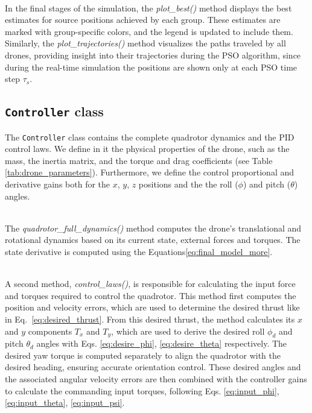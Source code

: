 \noindent\\
In the final stages of the simulation, the \textit{plot\_best()} 
method displays the best estimates for source positions achieved 
by each group. These estimates are marked with group-specific colors, 
and the legend is updated to include them. Similarly, 
the \textit{plot\_trajectories()} method visualizes the paths 
traveled by all drones, providing insight into their trajectories
during the PSO algorithm, since during the real-time simulation
the positions are shown only at each PSO time step $\tau_s$.

\subsection{\texttt{Controller} class}
\label{sec:controller_class}
The \texttt{Controller} class contains the 
complete quadrotor dynamics and the PID control laws. 
We define in it the physical properties of the drone, such as the mass, 
the inertia matrix, and the torque and drag coefficients (see Table \ref{tab:drone_parameters}).
Furthermore, we define the control proportional and derivative 
gains both for the $x$, $y$, $z$ positions and the 
the roll (\(\phi\)) and pitch (\(\theta\)) angles.

\noindent\\
The \textit{quadrotor\_full\_dynamics()} method computes 
the drone's translational and rotational dynamics based on 
its current state, external forces and torques. 
The state derivative is computed using the Equations\ref{eq:final_model_more}.

\noindent\\
A second method, \textit{control\_laws()}, is responsible 
for calculating the input force and torques required 
to control the quadrotor. This method first computes 
the position and velocity errors, which are used to 
determine the desired thrust like in Eq.~\ref{eq:desired_thrust}. 
From this desired thrust, the method calculates its 
$x$ and $y$ components \(T_x\) and \(T_y\), 
which are used to derive the desired roll \(\phi_d\) 
and pitch \(\theta_d\) angles with Eqs. \ref{eq:desire_phi}, 
\ref{eq:desire_theta} respectively. 
The desired yaw torque is computed separately 
to align the quadrotor with the desired heading, 
ensuring accurate orientation control. These desired angles and the 
associated angular velocity errors are then combined 
with the controller gains to calculate the commanding input torques,
following Eqs. \ref{eq:input_phi}, \ref{eq:input_theta}, 
\ref{eq:input_psi}. 

